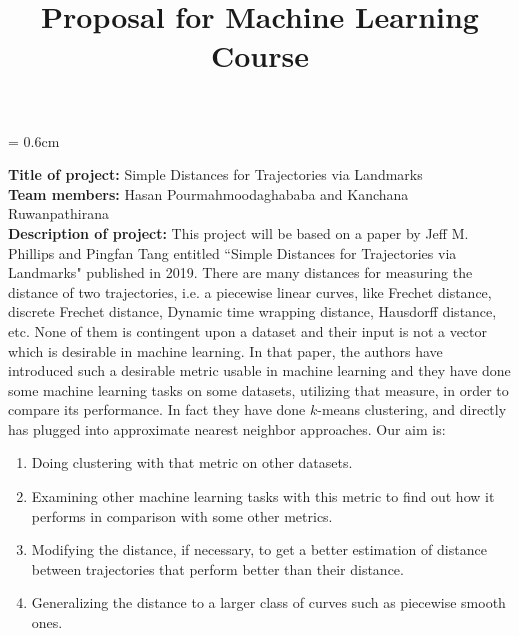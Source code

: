 \documentclass[12pt,a4paper]{amsart}
\begin{document}
\title[Proposal for Machine Learning Course]
 {Proposal for Machine Learning Course}

\baselineskip= 0.6cm




\maketitle

\hspace{-0.55cm} {\bf Title of project:} Simple Distances for Trajectories via Landmarks \vspace{0.2cm} \\
{\bf Team members:} Hasan Pourmahmoodaghababa and Kanchana Ruwanpathirana \vspace{0.2cm} \\
{\bf Description of project:}
This project will be based on a paper by Jeff M. Phillips and Pingfan Tang entitled ``Simple Distances for Trajectories via Landmarks" published in 2019. There are many distances for measuring the distance of two trajectories, i.e. a piecewise linear curves, like Frechet distance, discrete Frechet distance, Dynamic time wrapping distance, Hausdorff distance, etc. None of them is contingent upon a dataset and their input is not a vector which is desirable in machine learning. In that paper, the authors have introduced such a desirable metric usable in machine learning and they have done some machine learning tasks on some datasets, utilizing that measure, in order to compare its performance. In fact they have done $k$-means clustering, and directly has plugged into approximate nearest neighbor approaches. Our aim is:
\begin{enumerate}
\item Doing clustering with that metric on other datasets.  
\item Examining other machine learning tasks with this metric to find out how it performs in comparison with some other metrics. 
\item Modifying the distance, if necessary, to get a better estimation of distance between trajectories that perform better than their distance. 
\item Generalizing the distance to a larger class of curves such as piecewise smooth ones. 
\end{enumerate}
\end{document}
